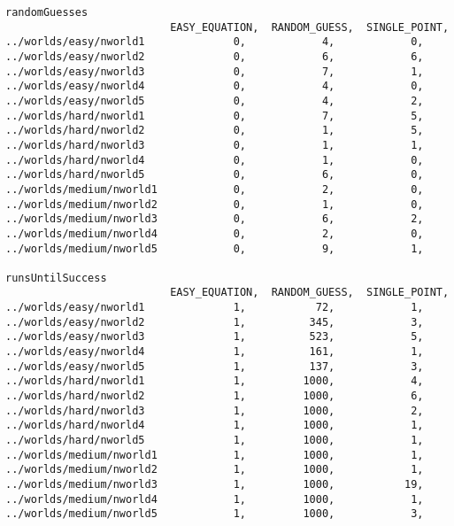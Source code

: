 \documentclass[british]{article}
\begin{document}
\begin{lstlisting}
randomGuesses
                          EASY_EQUATION,  RANDOM_GUESS,  SINGLE_POINT,
../worlds/easy/nworld1              0,            4,            0,
../worlds/easy/nworld2              0,            6,            6,
../worlds/easy/nworld3              0,            7,            1,
../worlds/easy/nworld4              0,            4,            0,
../worlds/easy/nworld5              0,            4,            2,
../worlds/hard/nworld1              0,            7,            5,
../worlds/hard/nworld2              0,            1,            5,
../worlds/hard/nworld3              0,            1,            1,
../worlds/hard/nworld4              0,            1,            0,
../worlds/hard/nworld5              0,            6,            0,
../worlds/medium/nworld1            0,            2,            0,
../worlds/medium/nworld2            0,            1,            0,
../worlds/medium/nworld3            0,            6,            2,
../worlds/medium/nworld4            0,            2,            0,
../worlds/medium/nworld5            0,            9,            1,

runsUntilSuccess
                          EASY_EQUATION,  RANDOM_GUESS,  SINGLE_POINT,
../worlds/easy/nworld1              1,           72,            1,
../worlds/easy/nworld2              1,          345,            3,
../worlds/easy/nworld3              1,          523,            5,
../worlds/easy/nworld4              1,          161,            1,
../worlds/easy/nworld5              1,          137,            3,
../worlds/hard/nworld1              1,         1000,            4,
../worlds/hard/nworld2              1,         1000,            6,
../worlds/hard/nworld3              1,         1000,            2,
../worlds/hard/nworld4              1,         1000,            1,
../worlds/hard/nworld5              1,         1000,            1,
../worlds/medium/nworld1            1,         1000,            1,
../worlds/medium/nworld2            1,         1000,            1,
../worlds/medium/nworld3            1,         1000,           19,
../worlds/medium/nworld4            1,         1000,            1,
../worlds/medium/nworld5            1,         1000,            3,


 \end{lstlisting}
 
\end{document}
